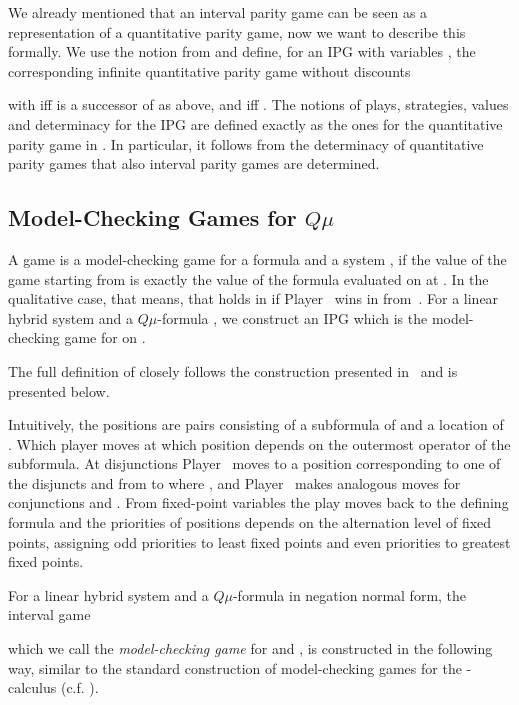 \documentclass[fleqn,envcountsame]{LMCS}
\newcommand{\Qmu}{\ensuremath{Q\mu}\xspace}
\newcommand{\pzero}{Player~\xspace}
\newcommand{\pone}{Player~\xspace}
\begin{document}
We already mentioned that an interval parity game can be seen
as a representation of a quantitative parity game, now we 
want to describe this formally.
We use the notion from \cite{FGK10} and define,
for an IPG with  variables
,
the corresponding infinite quantitative parity game without discounts

with  iff  is a successor of  as above,
 and
 iff
.
The notions of plays, strategies, values and determinacy 
for the IPG  are defined exactly as the ones for
the quantitative parity game  in \cite{FGK10}.
In particular, it follows from the determinacy of
quantitative parity games that also interval parity games
are determined.

\subsection{Model-Checking Games for \Qmu} \label{subsec_mc}

A game  is a model-checking game for a formula  and
a system , if the value of the game starting from  is
exactly the value of the formula evaluated on  at .
In the qualitative case, that means, that  holds in  if
\pzero wins in  from~. For a linear hybrid system 
and a \Qmu-formula , we construct an IPG
 which is the model-checking game for  on .

The full definition of  closely follows the construction
presented in~\cite{FGK10} and is presented below.

Intuitively, the positions are pairs consisting of a subformula
of  and a location of . 
Which player moves at which position depends on the outermost 
operator of the subformula. At disjunctions \pzero moves
to a position corresponding to one of the disjuncts and from 
 to  where 
, and \pone makes analogous
moves for conjunctions and . From fixed-point variables the play
moves back to the defining formula and the priorities
of positions depends on the alternation level of fixed points, 
assigning odd priorities to least fixed points and even priorities 
to greatest fixed points.

\begin{defi}
For a linear hybrid system 
and a \Qmu-formula  in negation normal form, the interval game 

which we call the \emph{model-checking game} for  and ,
is constructed in the following way, similar to the standard construction
of model-checking games for the -calculus (c.f. \cite{FGK10}).
\end{defi}
\end{document}
